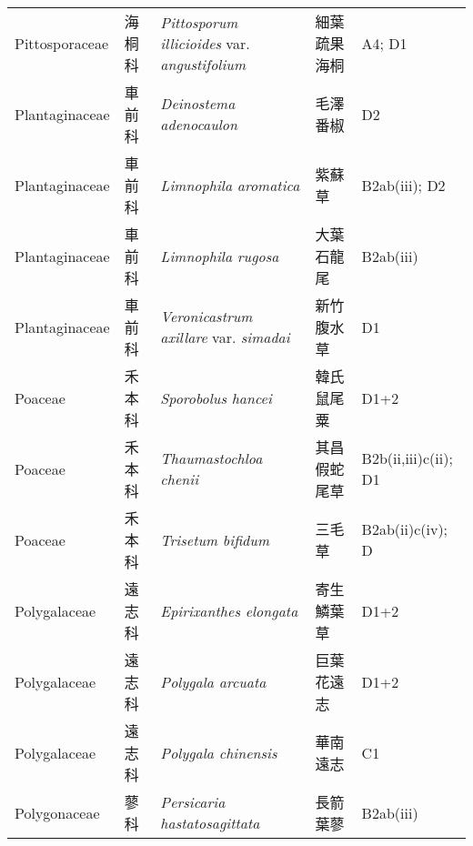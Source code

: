 {\begin{longtable}{p{2.5cm}p{2.5cm}p{4.5cm}p{2.5cm}p{3cm}}
    Pittosporaceae & 海桐科 & \textit{Pittosporum illicioides} var. \textit{angustifolium}  & 細葉疏果海桐 & A4; D1 \index{Pittosporum@\textit{Pittosporum}!illicioides@\textit{illicioides}!var. angustifolium@var. \textit{angustifolium}}  \index{細葉疏果海桐} \\
    Plantaginaceae & 車前科 & \textit{Deinostema adenocaulon}  & 毛澤番椒 & D2 \index{Deinostema@\textit{Deinostema}!adenocaulon@\textit{adenocaulon}}  \index{毛澤番椒} \\
    Plantaginaceae & 車前科 & \textit{Limnophila aromatica}  & 紫蘇草 & B2ab(iii); D2 \index{Limnophila@\textit{Limnophila}!aromatica@\textit{aromatica}}  \index{紫蘇草} \\
    Plantaginaceae & 車前科 & \textit{Limnophila rugosa}  & 大葉石龍尾 & B2ab(iii) \index{Limnophila@\textit{Limnophila}!rugosa@\textit{rugosa}}  \index{大葉石龍尾} \\
    Plantaginaceae & 車前科 & \textit{Veronicastrum axillare} var. \textit{simadai}  & 新竹腹水草 & D1 \index{Veronicastrum@\textit{Veronicastrum}!axillare@\textit{axillare}!var. simadai@var. \textit{simadai}}  \index{新竹腹水草} \\
    Poaceae & 禾本科 & \textit{Sporobolus hancei}  & 韓氏鼠尾粟 & D1+2 \index{Sporobolus@\textit{Sporobolus}!hancei@\textit{hancei}}  \index{韓氏鼠尾粟} \\
    Poaceae & 禾本科 & \textit{Thaumastochloa chenii}  & 其昌假蛇尾草 & B2b(ii,iii)c(ii); D1 \index{Thaumastochloa@\textit{Thaumastochloa}!chenii@\textit{chenii}}  \index{其昌假蛇尾草} \\
    Poaceae & 禾本科 & \textit{Trisetum bifidum}  & 三毛草 & B2ab(ii)c(iv); D \index{Trisetum@\textit{Trisetum}!bifidum@\textit{bifidum}}  \index{三毛草} \\
    Polygalaceae & 遠志科 & \textit{Epirixanthes elongata}  & 寄生鱗葉草 & D1+2 \index{Epirixanthes@\textit{Epirixanthes}!elongata@\textit{elongata}}  \index{寄生鱗葉草} \\
    Polygalaceae & 遠志科 & \textit{Polygala arcuata}  & 巨葉花遠志 & D1+2 \index{Polygala@\textit{Polygala}!arcuata@\textit{arcuata}}  \index{巨葉花遠志} \\
    Polygalaceae & 遠志科 & \textit{Polygala chinensis}  & 華南遠志 & C1 \index{Polygala@\textit{Polygala}!chinensis@\textit{chinensis}}  \index{華南遠志} \\
    Polygonaceae & 蓼科 & \textit{Persicaria hastatosagittata}  & 長箭葉蓼 & B2ab(iii) \index{Persicaria@\textit{Persicaria}!hastatosagittata@\textit{hastatosagittata}}  \index{長箭葉蓼} \\

\end{longtable}}
